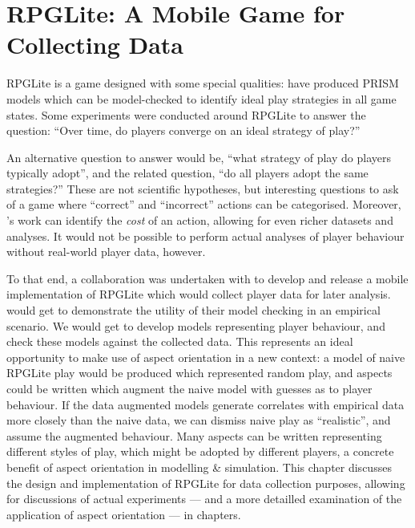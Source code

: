 \chapter{RPGLite: A Mobile Game for Collecting Data}

RPGLite is a game designed with some special qualities: \citeauthor{kavanagh2020}
have produced PRISM models which can be model-checked to identify ideal play
strategies in all game states\cite{kavanagh2020}. Some experiments were conducted around RPGLite to answer
the question: ``Over time, do players converge on an ideal strategy of
play?''

An alternative question to answer would be, ``what strategy of play do players
typically adopt'', and the related question, ``do all players adopt the same
strategies?'' These are not scientific hypotheses, but interesting questions to
ask of a game where ``correct'' and ``incorrect'' actions can be categorised.
Moreover, \citeauthor{kavanagh2020}'s work can identify the \emph{cost} of an
action, allowing for even richer datasets and analyses. It would not be possible
to perform actual analyses of player behaviour without real-world player data,
however.

To that end, a collaboration was undertaken with \citeauthor{kavanagh2020} to
develop and release a mobile implementation of RPGLite which would collect
player data for later analysis. \citeauthor{kavanagh2020} would get to
demonstrate the utility of their model checking in an empirical scenario. We
would get to develop models representing player behaviour, and check these
models against the collected data. This represents an ideal opportunity to make
use of aspect orientation in a new context: a model of naive RPGLite play would
be produced which represented random play, and aspects could be written which augment the naive
model with guesses as to player behaviour. If the data augmented models generate
correlates with empirical data more closely than the naive data, we can dismiss
naive play as ``realistic'', and assume the augmented behaviour. Many aspects
can be written representing different styles of play, which might be adopted by
different players, a concrete benefit of aspect orientation in modelling \&
simulation. This chapter discusses the design and implementation of RPGLite for data
collection purposes, allowing for discussions of actual experiments --- and a
more detailled examination of the application of aspect orientation --- in
chapters.

